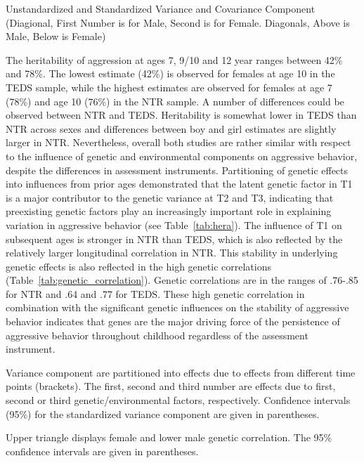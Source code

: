 \begin{table}
  \caption{Unstandardized and Standardized Variance and Covariance Component (Diagional,
    First Number is for Male, Second is for Female.
    Diagonals, Above is Male, Below is Female)}\label{tab:var_components}
\end{table}
The heritability of aggression at ages 7, 9/10 and 12 year ranges between 42\% and 78\%.  The lowest estimate (42\%) is observed for females at age 10 in the TEDS sample, while the highest estimates are observed for females at age 7 (78\%) and age 10 (76\%) in the NTR sample.
A number of differences could be observed between NTR and TEDS.
Heritability is somewhat lower in TEDS than NTR across sexes and differences between boy and girl estimates are slightly larger in NTR.
Nevertheless, overall both studies are rather similar with respect to the influence of genetic and environmental components on aggressive behavior, despite the differences in assessment instruments.
Partitioning of genetic effects into influences from prior ages demonstrated that the latent genetic factor in T1 is a major contributor to the genetic variance at T2 and T3, indicating that preexisting genetic factors play an increasingly important role in explaining variation in aggressive behavior (see Table~\ref{tab:hera}).
The influence of T1 on subsequent ages is stronger in NTR than TEDS, which is also reflected by the relatively larger longitudinal correlation in NTR.
This stability in underlying genetic effects is also reflected in the high genetic correlations (Table~\ref{tab:genetic_correlation}).
Genetic correlations are in the ranges of .76-.85 for NTR and .64 and .77 for TEDS.
These high genetic correlation in combination with the significant genetic influences on the stability of aggressive behavior indicates that genes are the major driving force of the persistence of aggressive behavior throughout childhood regardless of the assessment instrument. 

\begin{table}
  \caption{Variance component are partitioned into effects due to effects from different time points (brackets).
    The first, second and third number are effects due to first, second or third genetic/environmental factors, respectively.
    Confidence intervals (95\%) for the standardized variance component are given in parentheses.
}\label{tab:hera}
\end{table}

\begin{table}
  \caption{Upper triangle displays female and lower male genetic correlation.
    The 95\% confidence intervals are given in parentheses.
}\label{tab:genetic_correlation}
\end{table}
